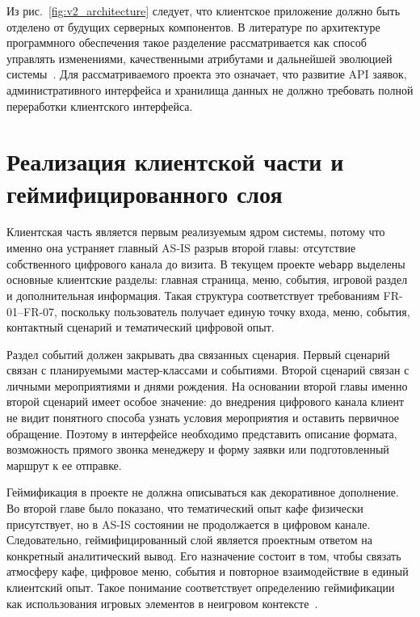 Из рис.~\ref{fig:v2_architecture} следует, что клиентское приложение должно быть отделено от будущих серверных компонентов. В литературе по архитектуре программного обеспечения такое разделение рассматривается как способ управлять изменениями, качественными атрибутами и дальнейшей эволюцией системы~\cite{bass2021,iso25010_2023}. Для рассматриваемого проекта это означает, что развитие API заявок, административного интерфейса и хранилища данных не должно требовать полной переработки клиентского интерфейса.

\section{Реализация клиентской части и геймифицированного слоя}

Клиентская часть является первым реализуемым ядром системы, потому что именно она устраняет главный AS-IS разрыв второй главы: отсутствие собственного цифрового канала до визита. В текущем проекте \texttt{webapp} выделены основные клиентские разделы: главная страница, меню, события, игровой раздел и дополнительная информация. Такая структура соответствует требованиям FR-01--FR-07, поскольку пользователь получает единую точку входа, меню, события, контактный сценарий и тематический цифровой опыт.

Раздел событий должен закрывать два связанных сценария. Первый сценарий связан с планируемыми мастер-классами и событиями. Второй сценарий связан с личными мероприятиями и днями рождения. На основании второй главы именно второй сценарий имеет особое значение: до внедрения цифрового канала клиент не видит понятного способа узнать условия мероприятия и оставить первичное обращение. Поэтому в интерфейсе необходимо представить описание формата, возможность прямого звонка менеджеру и форму заявки или подготовленный маршрут к ее отправке.

Геймификация в проекте не должна описываться как декоративное дополнение. Во второй главе было показано, что тематический опыт кафе физически присутствует, но в AS-IS состоянии не продолжается в цифровом канале. Следовательно, геймифицированный слой является проектным ответом на конкретный аналитический вывод. Его назначение состоит в том, чтобы связать атмосферу кафе, цифровое меню, события и повторное взаимодействие в единый клиентский опыт. Такое понимание соответствует определению геймификации как использования игровых элементов в неигровом контексте~\cite{deterding2011}.

